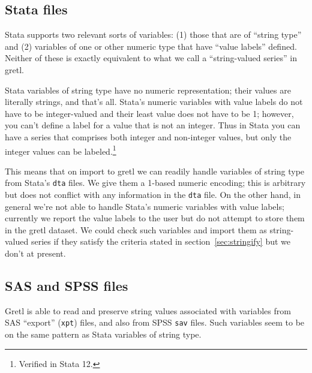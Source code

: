\subsection{Stata files}

Stata supports two relevant sorts of variables: (1) those that are of
``string type'' and (2) variables of one or other numeric type that
have ``value labels'' defined. Neither of these is exactly equivalent
to what we call a ``string-valued series'' in gretl.

Stata variables of string type have no numeric representation; their
values are literally strings, and that's all. Stata's numeric
variables with value labels do not have to be integer-valued and their
least value does not have to be 1; however, you can't define a label
for a value that is not an integer. Thus in Stata you can have a
series that comprises both integer and non-integer values, but only
the integer values can be labeled.\footnote{Verified in Stata 12.}

This means that on import to gretl we can readily handle variables of
string type from Stata's \texttt{dta} files. We give them a 1-based
numeric encoding; this is arbitrary but does not conflict with any
information in the \texttt{dta} file. On the other hand, in general
we're not able to handle Stata's numeric variables with value labels;
currently we report the value labels to the user but do not attempt to
store them in the gretl dataset. We could check such variables and
import them as string-valued series if they satisfy the criteria
stated in section~\ref{sec:stringify} but we don't at present.

\subsection{SAS and SPSS files}

Gretl is able to read and preserve string values associated with
variables from SAS ``export'' (\texttt{xpt}) files, and also from SPSS
\texttt{sav} files. Such variables seem to be on the same pattern as
Stata variables of string type.

